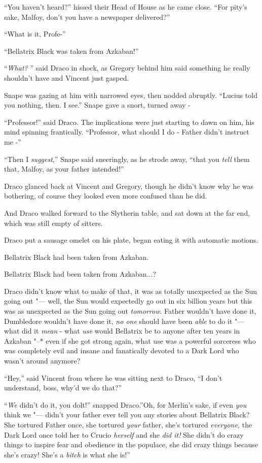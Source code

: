 ``You haven't heard?'' hissed their Head of House as he came close.
``For pity's sake, Malfoy, don't you have a newspaper delivered?''

``What is it, Profe-''

``Bellatrix Black was taken from Azkaban!''

``\emph{What?} '' said Draco in shock, as Gregory behind him said
something he really shouldn't have and Vincent just gasped.

Snape was gazing at him with narrowed eyes, then nodded abruptly.
``Lucius told you nothing, then. I see.'' Snape gave a snort, turned
away -

``Professor!'' said Draco. The implications were just starting to dawn
on him, his mind spinning frantically. ``Professor, what should I do -
Father didn't instruct me -''

``Then I \emph{suggest},'' Snape said sneeringly, as he strode away,
``that you \emph{tell} them that, Malfoy, as your father intended!''

Draco glanced back at Vincent and Gregory, though he didn't know why he
was bothering, of course they looked even more confused than he did.

And Draco walked forward to the Slytherin table, and sat down at the far
end, which was still empty of sitters.

Draco put a sausage omelet on his plate, began eating it with automatic
motions.

Bellatrix Black had been taken from Azkaban.

Bellatrix Black had been taken from Azkaban...?

Draco didn't know what to make of that, it was as totally unexpected as
the Sun going out "--- well, the Sun would expectedly go out in six billion
years but this was as unexpected as the Sun going out \emph{tomorrow}.
Father wouldn't have done it, Dumbledore wouldn't have done it, \emph{no
one} should have been \emph{able} to do it "--- what did it \emph{mean} -
what \emph{use} would Bellatrix be to anyone after ten years in Azkaban
"--* even if she got strong again, what use was a powerful sorceress who
was completely evil and insane and fanatically devoted to a Dark Lord
who wasn't around anymore?

``Hey,'' said Vincent from where he was sitting next to Draco, ``I don't
understand, boss, why'd we do that?''

``\emph{We} didn't do it, you dolt!'' snapped Draco.''Oh, for Merlin's
sake, if even \emph{you} think we "--- didn't your father ever tell you any
stories about Bellatrix Black? She tortured Father once, she tortured
\emph{your} father, she's tortured \emph{everyone,} the Dark Lord once
told her to Crucio \emph{herself} and she \emph{did it!} She didn't do
crazy things to inspire fear and obedience in the populace, she did
crazy things because she's crazy! She's a \emph{bitch} is what she is!''

